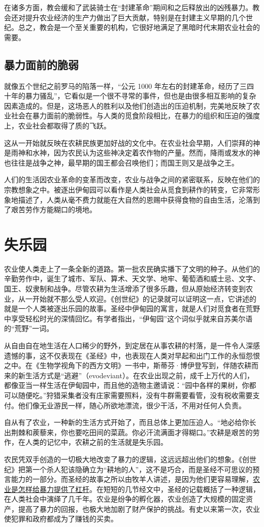 在诸多方面，教会缓和了武装骑士在“封建革命”期间和之后释放出的凶残暴力。教会还对提升农业经济的生产力做出了巨大贡献，特别是在封建主义早期的几个世纪。总之，教会是一个至关重要的机构，它很好地满足了黑暗时代末期农业社会的需要。

\subsection{暴力面前的脆弱}
就像五个世纪之前罗马的陷落一样，“公元 1000 年左右的封建革命，经历了三四十年的暴力骚乱”，它看似是一个很不寻常的事件，但也是由很多相互影响的复杂因素造成的。但是，这场恶人的胜利以及他们创造出的压迫机制，完美地反映了农业社会在暴力面前的脆弱性。与人类的觅食阶段相比，在暴力的组织和压迫的强度上，农业社会都取得了质的飞跃。

这从一开始就反映在农耕民族更加好战的文化中。在农业社会早期，人们崇拜的神是雨神和水神，因为农民认为这些神决定着农作物的产量。然而，降雨或发水的神也往往是战争之神，最早期的国王都会召唤他们；而国王则又是战争之王。

人们的生活因农业革命的变革而改变，农业与战争之间的紧密联系，反映在他们的宗教想象之中。被逐出伊甸园可以看作是人类社会从觅食到耕作的转变，它非常形象地描述了，人类从毫不费力就能在大自然的恩赐中获得食物的自由生活，沦落到了艰苦劳作方能糊口的境地。

\section{失乐园}
农业使人类走上了一条全新的道路。第一批农民确实播下了文明的种子。从他们的辛勤劳作中，诞生了城市、军队、算术、天文学、地牢、葡萄酒和威士忌、文字、国王、奴隶制和战争。尽管农耕为生活增添了很多乐趣，但从原始经济转变到农业，从一开始就不那么受人欢迎。《创世纪》的记录就可以证明这一点，它讲述的就是一个人类被逐出乐园的故事。圣经中伊甸园的寓言，就是人们对觅食者在荒野中享受轻松时光的深情回忆。有学者指出，“伊甸园”这个词似乎就来自苏美尔语的“荒野”一词。

从自由自在地生活在人口稀少的野外，到定居在从事农耕的村落，是一件令人深感遗憾的事，这不仅表现在《圣经》中，也表现在人类对早起和出门工作的永恒怨恨之中。在《生物学视角下的西方文明》一书中，斯蒂芬·博伊登写到，伴随农耕而来的新生活方式是“逃避”（evodeviant）。在农业出现之前，成千上万代的人们，都像亚当一样生活在伊甸园中，而且他的造物主邀请说：“园中各样的果树，你都可以随便吃。”狩猎采集者没有庄家需要照料，没有牛群需要看管，没有税收需要支付。他们像无业游民一样，随心所欲地漂流，很少干活，不用对任何人负责。

自从有了农业，一种新的生活方式开始了，而且总体上更加压迫人。“地必给你长出荆棘和蒺藜来，你也要吃田间的菜蔬。你必汗流满面才得糊口。”农耕是艰苦的劳作，在人类的记忆中，农耕之前的生活就是失乐园。

农民凭双手创造的一切极大地改变了暴力的逻辑，这远远超出他们的想象。《创世纪》把第一个杀人犯该隐确立为“耕地的人”，这不是巧合，而是圣经不可思议的预言能力的一部分。而圣经的故事之所以由牧羊人讲述，是因为他们更容易理解，\uline{农业是怎样给暴力提供了杠杆}。在短短的几节经文中，圣经的记载概括了一种逻辑，在人类社会中演绎了几千年。农业是纷争的孵化器，农业创造了大规模的固定资产，提高了暴力的回报，也极大地加剧了财产保护的挑战。有史以来第一次，农业使犯罪和政府都成为了赚钱的买卖。
